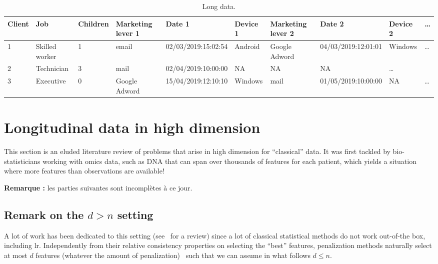 \begin{table}[ht]
    \centering
    \caption{Long data.}
    \label{tab:example_longitudinal}
    \begin{tiny}
\begin{tabular}{llllllllll}
Client & Job & Children & Marketing lever 1 & Date 1 & Device 1 & Marketing lever 2 & Date 2 & Device 2 & \dots \\
 \hline
1 & Skilled worker & 1 & email & 02/03/2019:15:02:54 & Android & Google Adword & 04/03/2019:12:01:01 & Windows & \dots \\
2 & Technician & 3 & mail & 02/04/2019:10:00:00 & NA & NA & NA & \dots\\
3 & Executive & 0 & Google Adword & 15/04/2019:12:10:10 & Windows & mail & 01/05/2019:10:00:00 & NA & \dots \\
\end{tabular}
    \end{tiny}
\end{table}


\section{Longitudinal data in high dimension}

This section is an eluded literature review of problems that arise in high dimension for ``classical'' data. It was first tackled by bio-statisticians working with omics data, such as DNA that can span over thousands of features for each patient, which yields a situation where more features than observations are available!

\textbf{Remarque :} les parties suivantes sont incomplètes à ce jour.

\subsection{Remark on the $d > n$ setting}

A lot of work has been dedicated to this setting (see~\cite{buhlmann2011statistics} for a review) since a lot of classical statistical methods do not work out-of-the box, including \gls{lr}. Independently from their relative consistency properties on selecting the ``best'' features, penalization methods naturally select at most $d$ features (whatever the amount of penalization)~\cite{zhu2004classification} such that we can assume in what follows $d \leq n$.

